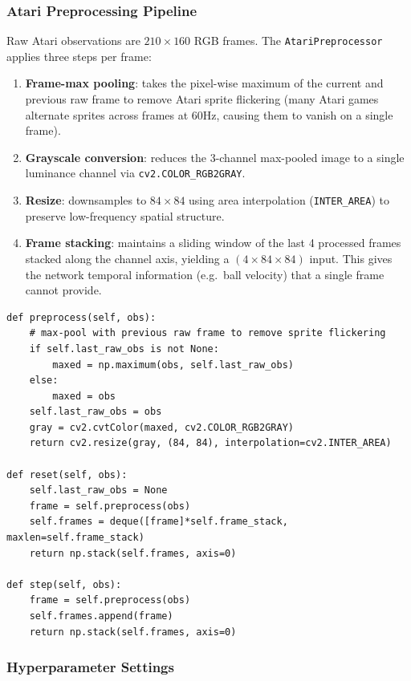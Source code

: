 \documentclass[12pt, a4paper]{report}
\begin{document}
\subsubsection*{Atari Preprocessing Pipeline}

Raw Atari observations are $210 \times 160$ RGB frames. The \texttt{AtariPreprocessor} applies three
steps per frame:

\begin{enumerate}
  \item \textbf{Frame-max pooling}: takes the pixel-wise maximum of the current and previous raw
        frame to remove Atari sprite flickering (many Atari games alternate sprites across frames
        at 60Hz, causing them to vanish on a single frame).
  \item \textbf{Grayscale conversion}: reduces the 3-channel max-pooled image to a single luminance
        channel via \texttt{cv2.COLOR\_RGB2GRAY}.
  \item \textbf{Resize}: downsamples to $84 \times 84$ using area interpolation
        (\texttt{INTER\_AREA}) to preserve low-frequency spatial structure.
  \item \textbf{Frame stacking}: maintains a sliding window of the last 4 processed frames stacked
        along the channel axis, yielding a $(4 \times 84 \times 84)$ input. This gives the network
        temporal information (e.g.\ ball velocity) that a single frame cannot provide.
\end{enumerate}

\begin{lstlisting}[caption={AtariPreprocessor: flicker removal + grayscale + resize + frame stack.}]
def preprocess(self, obs):
    # max-pool with previous raw frame to remove sprite flickering
    if self.last_raw_obs is not None:
        maxed = np.maximum(obs, self.last_raw_obs)
    else:
        maxed = obs
    self.last_raw_obs = obs
    gray = cv2.cvtColor(maxed, cv2.COLOR_RGB2GRAY)
    return cv2.resize(gray, (84, 84), interpolation=cv2.INTER_AREA)

def reset(self, obs):
    self.last_raw_obs = None
    frame = self.preprocess(obs)
    self.frames = deque([frame]*self.frame_stack, maxlen=self.frame_stack)
    return np.stack(self.frames, axis=0)

def step(self, obs):
    frame = self.preprocess(obs)
    self.frames.append(frame)
    return np.stack(self.frames, axis=0)
\end{lstlisting}

\subsubsection*{Hyperparameter Settings}
\end{document}
